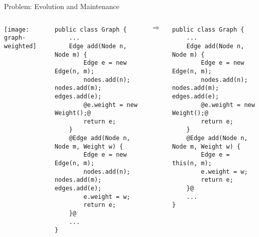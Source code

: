 \begin{frame}[fragile]{Problem: Evolution and Maintenance}
	\begin{columns}
			\texttt{[image: graph-weighted]}
\begin{tiny}
\begin{lstlisting}
public class Graph {
	...
	Edge add(Node n, Node m) {
		Edge e = new Edge(n, m);
		nodes.add(n); nodes.add(m); edges.add(e);
		@e.weight = new Weight();@
		return e;
	}
	@Edge add(Node n, Node m, Weight w) {
		Edge e = new Edge(n, m);
		nodes.add(n); nodes.add(m); edges.add(e);
		e.weight = w;
		return e;
	}@
	...
}
\end{lstlisting}
\end{tiny}
			\begin{LARGE}
				$\Rightarrow$
			\end{LARGE}
\begin{tiny}
\begin{lstlisting}
public class Graph {
	...
	Edge add(Node n, Node m) {
		Edge e = new Edge(n, m);
		nodes.add(n); nodes.add(m); edges.add(e);
		@e.weight = new Weight();@
		return e;
	}
	@Edge add(Node n, Node m, Weight w) {
		Edge e = this(n, m);
		e.weight = w;
		return e;
	}@
	...
}
\end{lstlisting}
\end{tiny}
	\end{columns}
\end{frame}